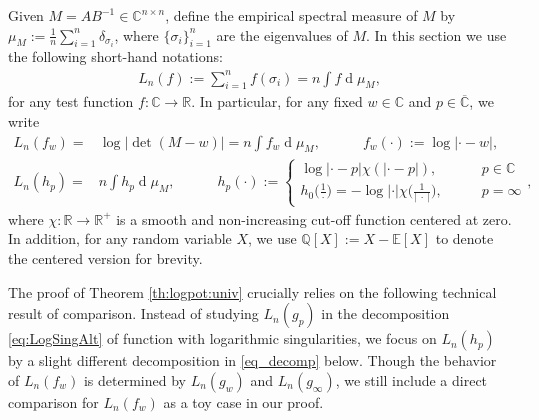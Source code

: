\documentclass[10pt,reqno]{amsart}
\numberwithin{equation}{section}
\numberwithin{figure}{section}
\theoremstyle{plain}
\newcommand{\R}{{\mathbb{R}}}
\newcommand{\C}{{\mathbb{C}}}
\newcommand{\<}{\langle}
\renewcommand{\>}{\rangle}
\newcommand{\E}{\mathbb{E}}
\newcommand{\dd}{\operatorname{d}\!{}}
\begin{document}
Given $M=AB^{-1}\in \C^{n\times n}$, define the empirical spectral measure of $M$ by $\mu_M:=\frac{1}{n}\sum_{i=1}^n \delta_{\sigma_i}$, where $\{\sigma_i\}_{i=1}^n$ are the eigenvalues of $M$. 
In this section we use the following short-hand notations: 
\begin{align}
L_n(f):=\sum_{i=1}^n f(\sigma_i)=n\int f\dd\mu_M,
\end{align}
for any test function $f:\C \rightarrow \R$. In particular, for any fixed $w\in \C$ and $p \in \overline{\C}$, we write
\begin{align}
L_n(f_w)=&\log |\det (M-w)|=n\int f_w \dd\mu_M, \quad \qquad  f_w(\cdot):=\log|\cdot -w|,\label{eq_fw}\\
L_n(h_p)=&n\int h_p \dd\mu_M, \quad \qquad  h_p(\cdot):=
\begin{cases}
\log|\cdot -p| \chi(|\cdot -p|), \qquad & p\in \C \\
h_0\Big(\frac{1}{\cdot}\Big)=-\log |\cdot| \chi\Big(\frac{1}{|~\cdot~|}\Big), \qquad  & p=\infty
\end{cases},\label{eq_h}
\end{align}
where $\chi:\R \rightarrow \R^+$ is a smooth and non-increasing cut-off function centered at zero.  In addition, for any random variable $X$, we use $\mathbb{Q}[X]:=X-\E[X]$ to denote the centered version for brevity.  


%
%
%
%

\medskip


The proof of Theorem \ref{th:logpot:univ} crucially relies on the following technical result of comparison. Instead of studying $L_n(g_p)$ in the decomposition \eqref{eq:LogSingAlt} of function with logarithmic singularities, we focus on $L_n(h_p)$ by a slight different decomposition in \eqref{eq_decomp} below. Though the behavior of $L_n(f_w)$ is determined by $L_n(g_w)$ and $L_n(g_\infty)$, we still include a direct comparison for $L_n(f_w)$ as a toy case in our proof.
\end{document}
